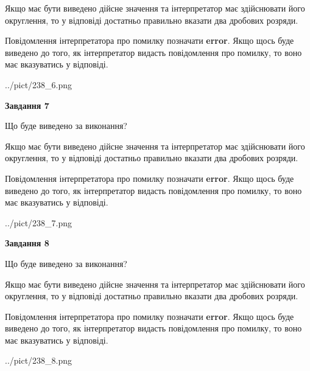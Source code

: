 \documentclass[12pt, ukrainian]{article}
\begin{document}
{\begin {Large}
Якщо має бути виведено дійсне значення та інтерпретатор має здійснювати його округлення, 
то у відповіді достатньо правильно вказати два дробових розряди.

Повідомлення інтерпретатора про помилку позначати \textbf{error}.
Якщо щось буде виведено до того, як інтерпретатор видасть повідомлення про помилку, 
то воно має вказуватись у відповіді. \par

\begin{center}
	{../pict/238_6.png}
\end{center}
\newpage

{\begin {center}\textbf{Завдання 7}\end {center}}\par
Що буде виведено за виконання? \par

Якщо має бути виведено дійсне значення та інтерпретатор має здійснювати його округлення, 
то у відповіді достатньо правильно вказати два дробових розряди.

Повідомлення інтерпретатора про помилку позначати \textbf{error}.
Якщо щось буде виведено до того, як інтерпретатор видасть повідомлення про помилку, 
то воно має вказуватись у відповіді. \par

\begin{center}
	{../pict/238_7.png}
\end{center}
\newpage

{\begin {center}\textbf{Завдання 8}\end {center}}\par
Що буде виведено за виконання? \par

Якщо має бути виведено дійсне значення та інтерпретатор має здійснювати його округлення, 
то у відповіді достатньо правильно вказати два дробових розряди.

Повідомлення інтерпретатора про помилку позначати \textbf{error}.
Якщо щось буде виведено до того, як інтерпретатор видасть повідомлення про помилку, 
то воно має вказуватись у відповіді. \par

\begin{center}
	{../pict/238_8.png}
\end{center}
\newpage


\end{Large}}
\end{document}
